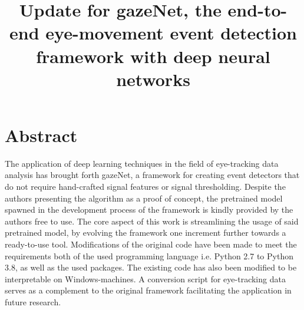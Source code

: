 \documentclass[conference]{IEEEtran}
\begin{document}
\title{Update for gazeNet, the end-to-end eye-movement event detection framework with deep neural networks\\
}

\author{

\and
{}

\and
{}

\and
{}
}


\maketitle
\section{Abstract}
The application of deep learning techniques in the field of eye-tracking data analysis has brought forth gazeNet, a framework for creating event detectors that do not require hand-crafted signal features or signal thresholding. Despite the authors presenting the algorithm as a proof of concept, the pretrained model spawned in the development process of the  framework is kindly provided by the authors free to use. The core aspect of this work is streamlining the usage of said pretrained model, by evolving the framework one increment further towards a ready-to-use tool. Modifications of the original code have been made to meet the requirements both of the used programming language i.e. Python 2.7 to Python 3.8, as well as the used packages. The existing code has also been modified to be interpretable on Windows-machines. A conversion script for eye-tracking data serves as a complement to the original framework facilitating the application in future research.
\end{document}
